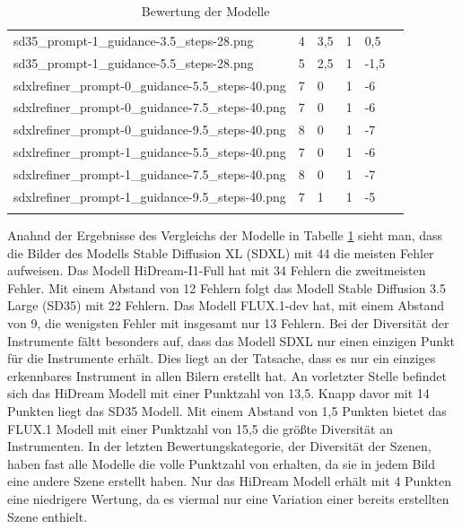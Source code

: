 \begin{table}[]
{\begin{tabular}{llllll}
        sd35\_prompt-1\_guidance-3.5\_steps-28.png & 4 & 3,5 & 1 & 0,5 \\ \addlinespace
        sd35\_prompt-1\_guidance-5.5\_steps-28.png & 5 & 2,5 & 1 & -1,5 \\ \addlinespace
        sdxlrefiner\_prompt-0\_guidance-5.5\_steps-40.png & 7 & 0 & 1 & -6 \\ \addlinespace
        sdxlrefiner\_prompt-0\_guidance-7.5\_steps-40.png & 7 & 0 & 1 & -6 \\ \addlinespace
        sdxlrefiner\_prompt-0\_guidance-9.5\_steps-40.png & 8 & 0 & 1 & -7 \\ \addlinespace
        sdxlrefiner\_prompt-1\_guidance-5.5\_steps-40.png & 7 & 0 & 1 & -6 \\ \addlinespace
        sdxlrefiner\_prompt-1\_guidance-7.5\_steps-40.png & 8 & 0 & 1 & -7 \\ \addlinespace
        sdxlrefiner\_prompt-1\_guidance-9.5\_steps-40.png & 7 & 1 & 1 & -5 \\ \addlinespace
        \bottomrule
        \end{tabular}
    }
    \caption{Bewertung der Modelle}
    \label{modelevaluationresults}
\end{table}

Anahnd der Ergebnisse des Vergleichs der Modelle in Tabelle \ref{modelevaluationresults} sieht man, dass die Bilder des Modells Stable Diffusion XL (SDXL) mit 44 die meisten Fehler aufweisen. Das Modell HiDream-I1-Full hat mit 34 Fehlern die zweitmeisten Fehler. Mit einem Abstand von 12 Fehlern folgt das Modell Stable Diffusion 3.5 Large (SD35) mit 22 Fehlern. Das Modell FLUX.1-dev hat, mit einem Abstand von 9, die wenigsten Fehler mit insgesamt nur 13 Fehlern.
Bei der Diversität der Instrumente fältt besonders auf, dass das Modell SDXL nur einen einzigen Punkt für die Instrumente erhält. Dies liegt an der Tatsache, dass es nur ein einziges erkennbares Instrument in allen Bilern erstellt hat. An vorletzter Stelle befindet sich das HiDream Modell mit einer Punktzahl von 13,5. Knapp davor mit 14 Punkten liegt das SD35 Modell. Mit einem Abstand von 1,5 Punkten bietet das FLUX.1 Modell mit einer Punktzahl von 15,5 die größte Diversität an Instrumenten.
In der letzten Bewertungskategorie, der Diversität der Szenen, haben fast alle Modelle die volle Punktzahl von erhalten, da sie in jedem Bild eine andere Szene erstellt haben. Nur das HiDream Modell erhält mit 4 Punkten eine niedrigere Wertung, da es viermal nur eine Variation einer bereits erstellten Szene enthielt.


